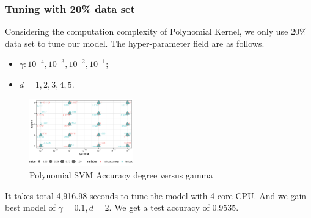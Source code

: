 \documentclass[conference]{IEEEtran}
\begin{document}
\subsubsection{Tuning with 20\% data set}
Considering the computation complexity of Polynomial Kernel, we only use 20\% data set to tune our model. The hyper-parameter field are as follows.
\begin{itemize}
  \item $\gamma:10^{-4},10^{-3},10^{-2},10^{-1}$;
  \item $d=1,2,3,4,5$.
\end{itemize}
\begin{figure}[htbp]
\centerline{\includegraphics[width=0.4\textwidth]{figure/Polynomial SVM Accuracy degree versus gamma.png}}
\caption{Polynomial SVM Accuracy degree versus gamma}
\label{Polynomial SVM Accuracy degree versus gamma}
\end{figure}
It takes total 4,916.98 seconds to tune the model with 4-core CPU. And we gain best model of $\gamma=0.1,d=2$. We get a test accuracy of $0.9535$.
\end{document}
